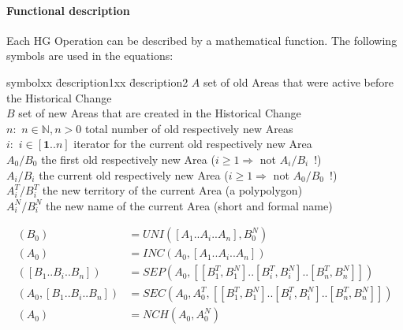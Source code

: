 
\paragraph{Functional description} %
\label{par:functional_description}

Each HG Operation can be described by a mathematical function. The following symbols are used in the equations:

\begin{addmargin}[1em]{0em}
\begin{tabbing}
  symbolxx \= description1xx \= description2 \kill
  $A$ \> set of old Areas that were active before the Historical Change \\
  $B$ \> set of new Areas that are created in the Historical Change \\
  $n:$ \> $n \in \mathbb{N}, n>0$ \> total number of old respectively new Areas \\
  $i:$ \> $i \in [\textbf{1} .. n]$ \> iterator for the current old respectively new Area \\
  $A_0/B_0$ \>    the first old respectively new Area ($i \geq 1 \Rightarrow$ not $A_i/B_i$~!) \\
  $A_i/B_i$ \>    the current old respectively new Area ($i \geq 1 \Rightarrow$ not $A_0/B_0$~!) \\
  $A_i^T/B_i^T$ \>the new territory of the current Area (a polypolygon) \\
  $A_i^N/B_i^N$ \>the new name of the current Area (short and formal name) \\
\end{tabbing}
\end{addmargin}

\vspace{-2.5em}
\begin{align*}
  (B_0)                       &= UNI([A_1 .. A_i .. A_n], B_0^N) \\
  (A_0)                       &= INC(A_0, [A_1 .. A_i .. A_n]) \\
  ([B_1 .. B_i .. B_n])       &= SEP(A_0, [[B_1^T, B_1^N] .. [B_i^T, B_i^N] .. [B_n^T, B_n^N]]) \\
  (A_0, [B_1 .. B_i .. B_n])  &= SEC(A_0, A_0^T, [[B_1^T, B_1^N] .. [B_i^T, B_i^N] .. [B_n^T, B_n^N]]) \\
  (A_0)                       &= NCH(A_0, A_0^N)
\end{align*}

